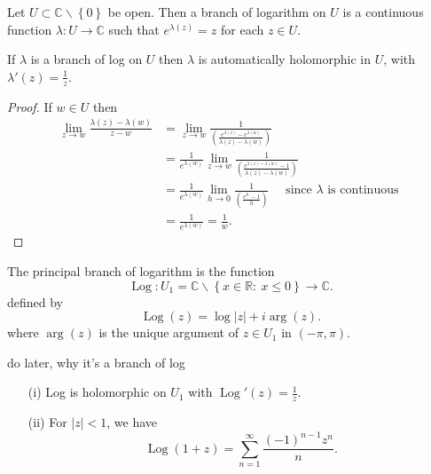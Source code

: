 \documentclass[a4paper]{scrartcl}
\begin{document}
\begin{definition*}
      Let $U \subset \mathbb{C} \backslash \left\{0\right\}$ be open. Then a branch of logarithm on $U$ is a continuous function $\lambda: U \rightarrow \mathbb{C}$ such that $e^{\lambda (z)}=z$ for each $z \in U$.
\end{definition*}
\begin{proposition}
      If $\lambda$ is a branch of log on $U$ then $\lambda$ is automatically holomorphic in $U$, with $\lambda' (z)=\frac{1}{z}$.
\end{proposition}
\begin{proof}
      If $w \in U$ then 
      \begin{align*}
           \lim_{z \rightarrow w} \frac{\lambda (z)- \lambda (w)}{z-w}&=\lim_{z \rightarrow w} \frac{1}{\left( \frac{e^{\lambda (z)}-e^{\lambda (w)}}{\lambda (z)- \lambda (w)}\right)}\\
           &=\frac{1}{e^{\lambda (w)}}\lim_{z \rightarrow w} \frac{1}{\left(\frac{e^{\lambda (z)-\lambda (w)}-1}{\lambda (z)- \lambda (w)}\right)}\\
           &=\frac{1}{e^{\lambda (w)}} \lim_{h \rightarrow 0} \frac{1}{\left( \frac{e^{h}-1}{h}\right)} \quad \text{ since } \lambda \text{ is continuous } \\
           &=\frac{1}{e^{\lambda (w)}}=\frac{1}{w}.
      \end{align*}
\end{proof}
\begin{definition*}
      The principal branch of logarithm is the function \[
      \operatorname{Log}: U_1 =\mathbb{C} \backslash \left\{x \in \mathbb{R}: \ x \leq 0\right\} \rightarrow \mathbb{C}
      .\] defined by \[
      \operatorname{Log}(z)= \operatorname{log}|z|+i \operatorname{arg}(z)
      .\] where $\operatorname{arg}(z)$ is the unique argument of $z \in U_1 $ in $(-\pi,\pi)$.
\end{definition*}
\begin{remark}
      do later, why it's a branch of log
\end{remark}
\begin{proposition}
      \begin{itemize}
           \item[(i)] Log is holomorphic on $U_1 $ with $\operatorname{Log}' (z)=\frac{1}{z}$. 
           \item[(ii)] For $|z|<1$, we have \[
           \operatorname{Log}(1+z)=\sum_{n=1}^{ \infty} \frac{(-1)^{n-1}z^{n}}{n}
           .\] 
      \end{itemize} 
\end{proposition}
\end{document}
